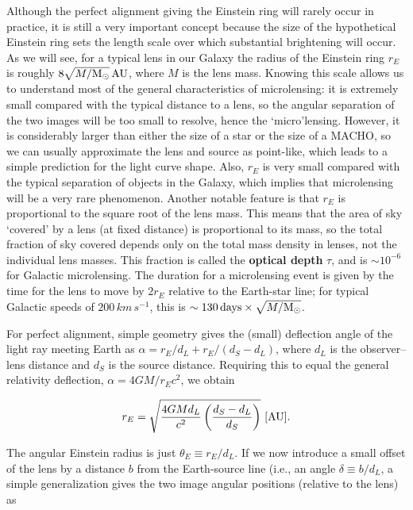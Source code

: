 \documentclass[a4paper,10pt]{article}
\begin{document}
{\noindent}Although the perfect alignment giving the Einstein ring will rarely occur in practice, it is still a very important concept because the size of the hypothetical Einstein ring sets the length scale over which substantial brightening will occur. As we will see, for a typical lens in our Galaxy the radius of the Einstein ring $r_E$ is roughly $8\sqrt{M/{\rm M_\odot}}\,{\rm AU}$, where $M$ is the lens mass. Knowing this scale allows us to understand most of the general characteristics of microlensing: it is extremely small compared with the typical distance to a lens, so the angular separation of the two images will be too small to resolve, hence the `micro'lensing. However, it is considerably larger than either the size of a star or the size of a MACHO, so we can usually approximate the lens and source as point-like, which leads to a simple prediction for the light curve shape. Also, $r_E$ is very small compared with the typical separation of objects in the Galaxy, which implies that microlensing will be a very rare phenomenon. Another notable feature is that $r_E$ is proportional to the square root of the lens mass. This means that the area of sky `covered' by a lens (at fixed distance) is proportional to its mass, so the total fraction of sky covered depends only on the total mass density in lenses, not the individual lens masses. This fraction is called the \textbf{optical depth} $\tau$, and is $\sim10^{-6}$ for Galactic microlensing. The duration for a microlensing event is given by the time for the lens to move by $2r_E$ relative to the Earth-star line; for typical Galactic speeds of $200\,{km\,s^{-1}}$, this is $\sim130\,{\rm days}\times\sqrt{M/{\rm M_\odot}}$.

{\noindent}For perfect alignment, simple geometry gives the (small) deflection angle of the light ray meeting Earth as $\alpha = r_E/d_L + r_E/(d_S-d_L)$, where $d_L$ is the observer–lens distance and $d_S$ is the source distance. Requiring this to equal the general relativity deflection, $\alpha=4GM/r_Ec^2$, we obtain

\begin{align*}
    r_E = \sqrt{\frac{4GMd_L}{c^2} \left(\frac{d_S-d_L}{d_S}\right)} ~ [{\rm AU}].
\end{align*}

{\noindent}The angular Einstein radius is just $\theta_E\equiv r_E/d_L$. If we now introduce a small offset of the lens by a distance $b$ from the Earth-source line (i.e., an angle $\delta\equiv b/d_L$, a simple generalization gives the two image angular positions (relative to the lens) as
\end{document}
